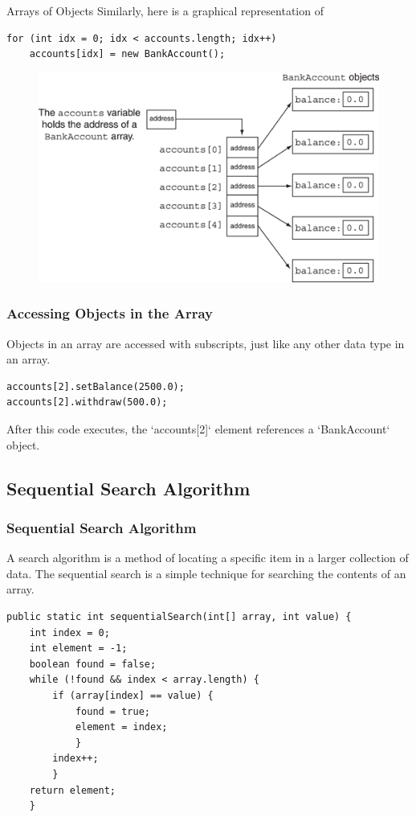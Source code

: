 \documentclass[11pt]{beamer}
\begin{document}
\begin{frame}[fragile]{Arrays of Objects}
Similarly, here is a graphical representation of
\begin{lstlisting}
for (int idx = 0; idx < accounts.length; idx++)
    accounts[idx] = new BankAccount();
\end{lstlisting}
    \noindent 
    \begin{figure}[H]
    \centering
    \includegraphics[scale=0.6]{Images/chapter07_section06_fig17.png}
    \end{figure}   
\end{frame}

\begin{frame}[fragile]
    \frametitle{Accessing Objects in the Array}
    Objects in an array are accessed with subscripts, just like any other data type in an array.
    \begin{lstlisting}
accounts[2].setBalance(2500.0);
accounts[2].withdraw(500.0);
    \end{lstlisting}
    After this code executes, the `accounts[2]` element references a `BankAccount` object.
\end{frame}

\subsection{Sequential Search Algorithm}
\begin{frame}[fragile]
    \frametitle{Sequential Search Algorithm}

    A search algorithm is a method of locating a specific item in a larger collection of data. The sequential search is a simple technique for searching the contents of an array.

    \begin{lstlisting}[basicstyle=\ttfamily\footnotesize]
public static int sequentialSearch(int[] array, int value) {
    int index = 0;
    int element = -1;
    boolean found = false;
    while (!found && index < array.length) {
        if (array[index] == value) {
            found = true;
            element = index;
            }
        index++;
        }
    return element;
    }
    \end{lstlisting}
\end{frame}
\end{document}
